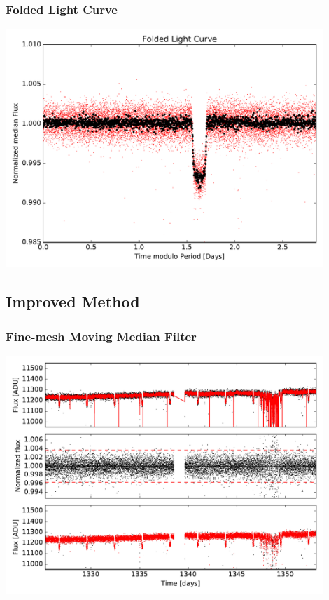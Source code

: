 \documentclass[notes]{beamer}
\begin{document}
\begin{frame}
\frametitle{Folded Light Curve}
\centering
\includegraphics[width=0.9\textwidth]{../figures/2018-11-27_12:41:56_Folded0.pdf}
\end{frame}

\subsection{Improved Method}

\begin{frame}
\frametitle{Fine-mesh Moving Median Filter}
\centering
\includegraphics[width=0.9\textwidth]{../figures/2018-11-27_14:45:48_fine_mesh0.pdf}
\end{frame}
\end{document}

